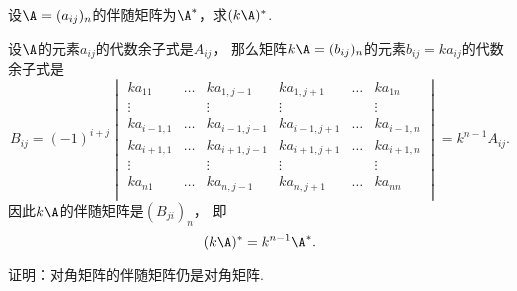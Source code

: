 \begin{example}
设\(\A=(a_{ij})_n\)的伴随矩阵为\(\A^*\)，求\((k\A)^*\).
\begin{solution}
设\(\A\)的元素\(a_{ij}\)的代数余子式是\(A_{ij}\)，
那么矩阵\(k\A = (b_{ij})_n\)的元素\(b_{ij} = k a_{ij}\)的代数余子式是\[
	B_{ij}
	= (-1)^{i+j}
	\begin{vmatrix}
		k a_{11} & \dots & k a_{1,j-1} & k a_{1,j+1} & \dots & k a_{1n} \\
		\vdots & & \vdots & \vdots & & \vdots \\
		k a_{i-1,1} & \dots & k a_{i-1,j-1} & k a_{i-1,j+1} & \dots & k a_{i-1,n} \\
		k a_{i+1,1} & \dots & k a_{i+1,j-1} & k a_{i+1,j+1} & \dots & k a_{i+1,n} \\
		\vdots & & \vdots & \vdots & & \vdots \\
		k a_{n1} & \dots & k a_{n,j-1} & k a_{n,j+1} & \dots & k a_{nn} \\
	\end{vmatrix}
	= k^{n-1} A_{ij}.
\]
因此\(k\A\)的伴随矩阵是\((B_{ji})_n\)，
即\begin{equation}\label{equation:行列式.伴随矩阵.数与矩阵乘积的伴随}
	(k \A)^* = k^{n-1} \A^*.
\end{equation}
\end{solution}
\end{example}

\begin{example}
证明：对角矩阵的伴随矩阵仍是对角矩阵.
\end{example}

